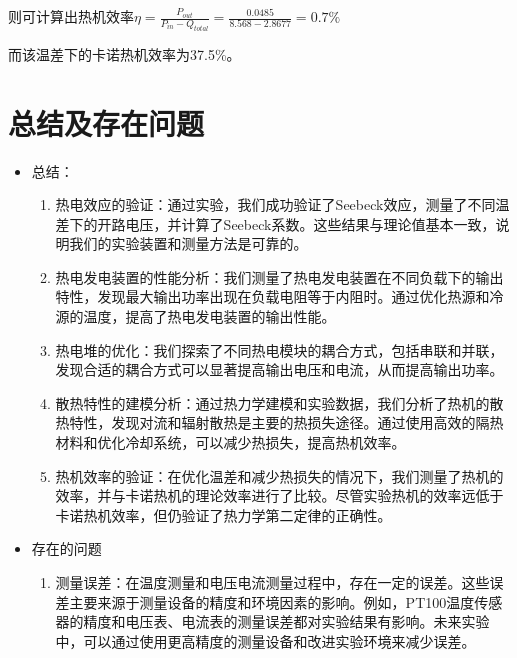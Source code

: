 \documentclass[dvipsnames, svgnames,a4paper,11pt]{article}
\begin{document}
        则可计算出热机效率$ \eta = \frac{P_{out}}{P_{in} - Q_{total}} = \frac{0.0485}{8.568 - 2.8677} = 0.7\% $

        而该温差下的卡诺热机效率为37.5\%。



\clearpage
\section{总结及存在问题}

    \begin{itemize}
        \item 总结：
        
            \begin{enumerate}
                \item 热电效应的验证：通过实验，我们成功验证了Seebeck效应，测量了不同温差下的开路电压，并计算了Seebeck系数。这些结果与理论值基本一致，说明我们的实验装置和测量方法是可靠的。
                
                \item 热电发电装置的性能分析：我们测量了热电发电装置在不同负载下的输出特性，发现最大输出功率出现在负载电阻等于内阻时。通过优化热源和冷源的温度，提高了热电发电装置的输出性能。
                
                \item 热电堆的优化：我们探索了不同热电模块的耦合方式，包括串联和并联，发现合适的耦合方式可以显著提高输出电压和电流，从而提高输出功率。
                
                \item 散热特性的建模分析：通过热力学建模和实验数据，我们分析了热机的散热特性，发现对流和辐射散热是主要的热损失途径。通过使用高效的隔热材料和优化冷却系统，可以减少热损失，提高热机效率。
                
                \item 热机效率的验证：在优化温差和减少热损失的情况下，我们测量了热机的效率，并与卡诺热机的理论效率进行了比较。尽管实验热机的效率远低于卡诺热机效率，但仍验证了热力学第二定律的正确性。
            \end{enumerate}


        \item 存在的问题
        
            \begin{enumerate}
                \item 测量误差：在温度测量和电压电流测量过程中，存在一定的误差。这些误差主要来源于测量设备的精度和环境因素的影响。例如，PT100温度传感器的精度和电压表、电流表的测量误差都对实验结果有影响。未来实验中，可以通过使用更高精度的测量设备和改进实验环境来减少误差。


\end{enumerate}
\end{itemize}
\end{document}
